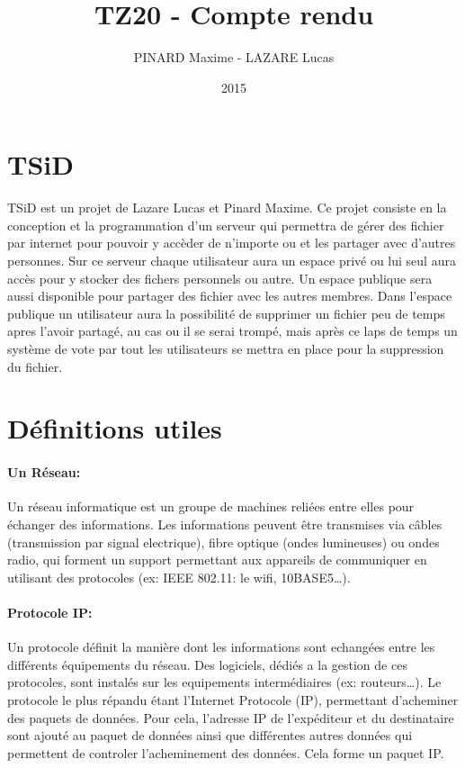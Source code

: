 \documentclass[12pt,a4paper,twoside]{article}
\title{TZ20 - Compte rendu}
\author{PINARD Maxime - LAZARE Lucas}
\date{2015}
\begin{document}
    \maketitle{}
    \newpage{}

    \section{TSiD}
    TSiD est un projet de Lazare Lucas et Pinard Maxime. Ce projet consiste en la conception et la programmation d'un serveur qui permettra de gérer des fichier par internet pour pouvoir y accèder de n'importe ou et les partager avec d'autres personnes. Sur ce serveur chaque utilisateur aura un espace privé ou lui seul aura accès pour y stocker des fichers personnels ou autre. Un espace publique sera aussi disponible pour partager des fichier avec les autres membres. Dans l'espace publique un utilisateur aura la possibilité de supprimer un fichier peu de temps apres l'avoir partagé, au cas ou il se serai trompé, mais après ce laps de temps un système de vote par tout les utilisateurs se mettra en place pour la suppression du fichier.

    \section{Définitions utiles}

    \paragraph*{Un Réseau:\\}
    Un réseau informatique est un groupe de machines reliées entre elles pour échanger des informations. Les informations peuvent être transmises via câbles (transmission par signal electrique), fibre optique (ondes lumineuses) ou ondes radio, qui forment un support permettant aux appareils de communiquer en utilisant des protocoles (ex: IEEE 802.11: le wifi, 10BASE5\ldots).

    \paragraph*{Protocole IP:\\}
    Un protocole définit la manière dont les informations sont echangées entre les différents équipements du réseau. Des logiciels, dédiés a la gestion de ces protocoles, sont instalés sur les equipements intermédiaires (ex: routeurs\ldots{}). Le protocole le plus répandu étant l'Internet Protocole (IP), permettant d'acheminer des paquets de données. Pour cela, l'adresse IP de l'expéditeur et du destinataire sont ajouté au paquet de données ainsi que différentes autres données qui permettent de controler l'acheminement des données. Cela forme un paquet IP.
\end{document}

